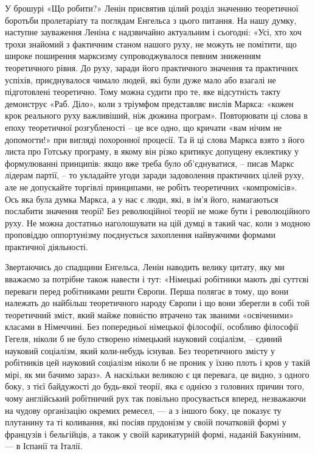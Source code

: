\documentclass[12pt,a4paper,openany]{book}
\begin{document}
У брошурі «Що робити?» Ленін присвятив цілий розділ значенню теоретичної боротьби пролетаріату та поглядам Енгельса з цього питання. На нашу думку, наступне зауваження Леніна є надзвичайно актуальним і сьогодні: «Усі, хто хоч трохи знайомий з фактичним станом нашого руху, не можуть не помітити, що широке поширення марксизму супроводжувалося певним зниженням теоретичного рівня. До руху, заради його практичного значення та практичних успіхів, приєднувалося чимало людей, які були дуже мало або взагалі не підготовлені теоретично. Тому можна судити про те, яке відсутність такту демонструє «Раб. Діло», коли з тріумфом представляє вислів Маркса: «кожен крок реального руху важливіший, ніж дюжина програм». Повторювати ці слова в епоху теоретичної розгубленості – це все одно, що кричати «вам нічим не допомогти!» при вигляді похоронної процесії. Та й ці слова Маркса взято з його листа про Готську програму, в якому він різко критикує допущену еклектику у формулюванні принципів: якщо вже треба було об’єднуватися, – писав Маркс лідерам партії, – то укладайте угоди заради задоволення практичних цілей руху, але не допускайте торгівлі принципами, не робіть теоретичних «компромісів». Ось яка була думка Маркса, а у нас є люди, які, в ім’я його, намагаються послабити значення теорії! Без революційної теорії не може бути і революційного руху. Не можна достатньо наголошувати на цій думці в такий час, коли з модною проповіддю оппортунізму поєднується захоплення найвужчими формами практичної діяльності.

Звертаючись до спадщини Енгельса, Ленін наводить велику цитату, яку ми вважаємо за потрібне також навести і тут: «Німецькі робітники мають дві суттєві переваги перед робітниками решти Європи. Перша полягає в тому, що вони належать до найбільш теоретичного народу Європи і що вони зберегли в собі той теоретичний зміст, який майже повністю втрачено так званими «освіченими» класами в Німеччині. Без попередньої німецької філософії, особливо філософії Гегеля, ніколи б не було створено німецький науковий соціалізм, – єдиний науковий соціалізм, який коли-небудь існував. Без теоретичного змісту у робітників цей науковий соціалізм ніколи б не проник у їхню плоть і кров у такій мірі, як ми бачимо зараз». А наскільки великою є ця перевага, це видно, з одного боку, з тієї байдужості до будь-якої теорії, яка є однією з головних причин того, чому англійський робітничий рух так повільно просувається вперед, незважаючи на чудову організацію окремих ремесел, — а з іншого боку, це показує ту плутанину та ті коливання, які посіяв прудонізм у своїй початковій формі у французів і бельгійців, а також у своїй карикатурній формі, наданій Бакуніним, — в Іспанії та Італії.
\end{document}
